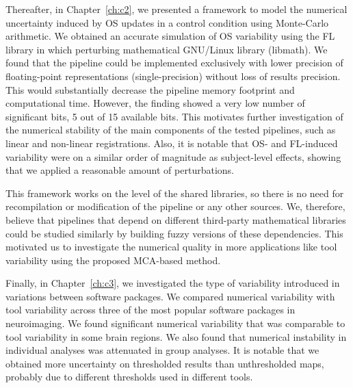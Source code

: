 Thereafter, in Chapter~\ref{ch:c2}, we presented a framework to model the numerical uncertainty induced by OS updates in a control condition using Monte-Carlo arithmetic. 
We obtained an accurate simulation of OS variability using the FL library in which perturbing mathematical GNU/Linux library (libmath).
We found that the pipeline could be implemented exclusively with lower precision of floating-point representations (single-precision)
without loss of results precision. This would substantially decrease the pipeline memory footprint and computational time.
However, the finding showed a very low number of significant bits, 5 out of 15 available bits.
This motivates further investigation of the numerical stability of the main components of the tested pipelines, such as linear and non-linear registrations.
Also, it is notable that OS- and FL-induced variability were on a similar order of magnitude as subject-level effects,
showing that we applied a reasonable amount of perturbations.

This framework works on the level of the shared libraries, so there is no need for recompilation or modification
of the pipeline or any other sources.
We, therefore, believe that pipelines that depend
on different third-party mathematical libraries could be studied similarly by building fuzzy
versions of these dependencies. This motivated us to investigate the numerical quality in
more applications like tool variability using the proposed MCA-based method.

Finally, in Chapter~\ref{ch:c3}, we investigated the type of variability introduced in variations between software packages.
We compared numerical variability with tool variability across three of the most popular software packages in neuroimaging.
We found significant numerical variability that was comparable to tool variability in some brain regions.
We also found that numerical instability in individual analyses was attenuated in group analyses.
It is notable that we obtained more uncertainty on thresholded results than unthresholded maps, probably due to
different thresholds used in different tools.


